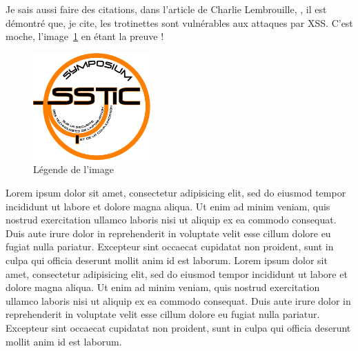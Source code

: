 Je sais aussi faire des citations, dans l'article de Charlie
Lembrouille, \cite{charlielembrouille}, il est démontré que, je cite,
\og{}les trotinettes sont vulnérables aux attaques par XSS\fg{}. C'est
moche, l'image~\ref{fig:monnom:archi} en étant la preuve !


\begin{figure}[ht]
  \centering
  \includegraphics[width=0.4\textwidth]{MonNom/img/archi}
  \caption{Légende de l'image}
  \label{fig:monnom:archi}
\end{figure}

Lorem ipsum dolor sit amet, consectetur adipisicing elit, sed do
eiusmod tempor incididunt ut labore et dolore magna aliqua. Ut enim ad
minim veniam, quis nostrud exercitation ullamco laboris nisi ut
aliquip ex ea commodo consequat. Duis aute irure dolor in
reprehenderit in voluptate velit esse cillum dolore eu fugiat nulla
pariatur. Excepteur sint occaecat cupidatat non proident, sunt in
culpa qui officia deserunt mollit anim id est laborum. Lorem ipsum
dolor sit amet, consectetur adipisicing elit, sed do eiusmod tempor
incididunt ut labore et dolore magna aliqua. Ut enim ad minim veniam,
quis nostrud exercitation ullamco laboris nisi ut aliquip ex ea
commodo consequat. Duis aute irure dolor in reprehenderit in voluptate
velit esse cillum dolore eu fugiat nulla pariatur. Excepteur sint
occaecat cupidatat non proident, sunt in culpa qui officia deserunt
mollit anim id est laborum.

